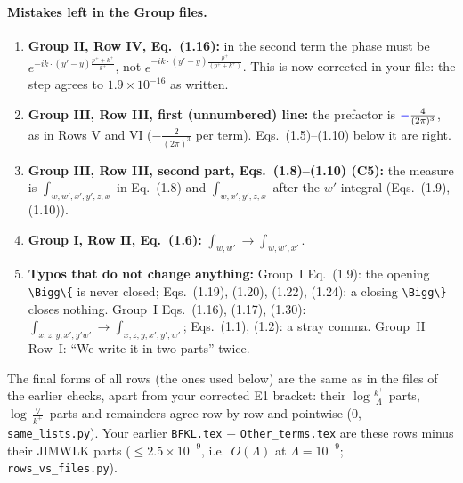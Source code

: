 \documentclass[10pt]{article}
\numberwithin{equation}{section}
\newcommand{\new}[1]{{\color{blue}#1}}
\begin{document}
\paragraph{Mistakes left in the Group files.}
\begin{enumerate}
\item[\textbf{M2}] \textbf{Group II, Row IV, Eq.~(1.16):} in the second term the phase must be $e^{-ik\cdot(y'-y)\frac{p^++k^+}{k^+}}$, not $e^{-ik\cdot(y'-y)\frac{p^+}{(p^++k^+)}}$. \new{This is now corrected in your file}: the step agrees to $1.9\times10^{-16}$ as written.
\item[\textbf{M3}] \textbf{Group III, Row III, first (unnumbered) line:} the prefactor is $\new{-}\frac{4}{(2\pi)^3}$, as in Rows V and VI ($-\frac{2}{(2\pi)^3}$ per term). Eqs.~(1.5)--(1.10) below it are right.
\item[\textbf{M4}] \textbf{Group III, Row III, second part, Eqs.~(1.8)--(1.10) (C5):} the measure is $\int_{w,w',x',y',z,x}$ in Eq.~(1.8) and $\int_{w,x',y',z,x}$ after the $w'$ integral (Eqs.~(1.9), (1.10)).
\item[\textbf{M5}] \textbf{Group I, Row II, Eq.~(1.6):} $\int_{w,w'}\to\int_{w,w',x'}$.
\item[\textbf{M6}] \textbf{Typos that do not change anything:} Group~I Eq.~(1.9): the opening \texttt{\textbackslash Bigg\textbackslash\{} is never closed; Eqs.~(1.19), (1.20), (1.22), (1.24): a closing \texttt{\textbackslash Bigg\textbackslash\}} closes nothing. Group~I Eqs.~(1.16), (1.17), (1.30): $\int_{x,z,y,x',y'w'}\to\int_{x,z,y,x',y',w'}$; Eqs.~(1.1), (1.2): a stray comma. Group~II Row~I: ``We write it in two parts'' twice.
\end{enumerate}
\noindent The final forms of all rows (the ones used below) are the same as in the files of the earlier checks, apart from your corrected E1 bracket: their $\log\frac{k^+}{\Lambda}$ parts, $\log\frac{\vee}{k^+}$ parts and remainders agree row by row and pointwise ($0$, \texttt{same\_lists.py}). Your earlier \texttt{BFKL.tex} $+$ \texttt{Other\_terms.tex} are these rows minus their JIMWLK parts ($\le2.5\times10^{-9}$, i.e.\ $O(\Lambda)$ at $\Lambda=10^{-9}$; \texttt{rows\_vs\_files.py}).
\end{document}
